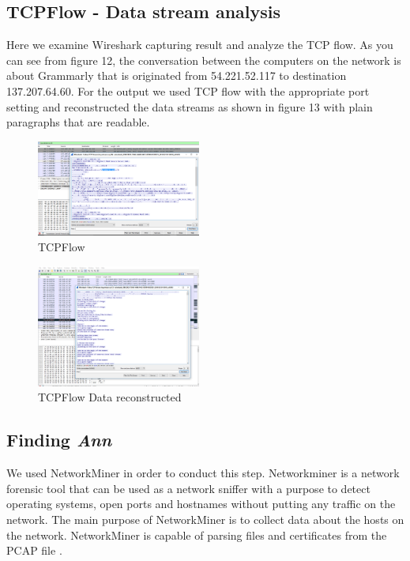 \documentclass{article}
\begin{document}
\subsection{TCPFlow - Data stream analysis}
Here we examine Wireshark capturing result and analyze the TCP flow. As you can see from figure 12, the conversation between the computers on the network is about Grammarly that is originated from 54.221.52.117 to destination 137.207.64.60. For the output we used TCP flow with the appropriate port setting and reconstructed the data streams as shown in figure 13 with plain paragraphs that are readable. 
\begin{figure}[H]
	\begin{center}
		\includegraphics[width=0.48\textwidth]{TCPFLOW1.png}
	\end{center}
	\caption{TCPFlow}
	\label{fig:Prd}
\end{figure}

\begin{figure}[H]
	\begin{center}
		\includegraphics[width=0.48\textwidth]{TCPFLOW2.png}
	\end{center}
	\caption{TCPFlow Data reconstructed}
	\label{fig:Prd}
\end{figure}

\subsection{Finding \textit{{Ann}}}
We used NetworkMiner in order to conduct this step. Networkminer is a network forensic tool that can be used as a network sniffer with a purpose to detect operating systems, open ports and hostnames without putting any traffic on the network. The main purpose of NetworkMiner is to collect data about the hosts on the network. NetworkMiner is capable of parsing files and certificates from the PCAP file \cite{crenshaw2008osfuscate}.
\end{document}
